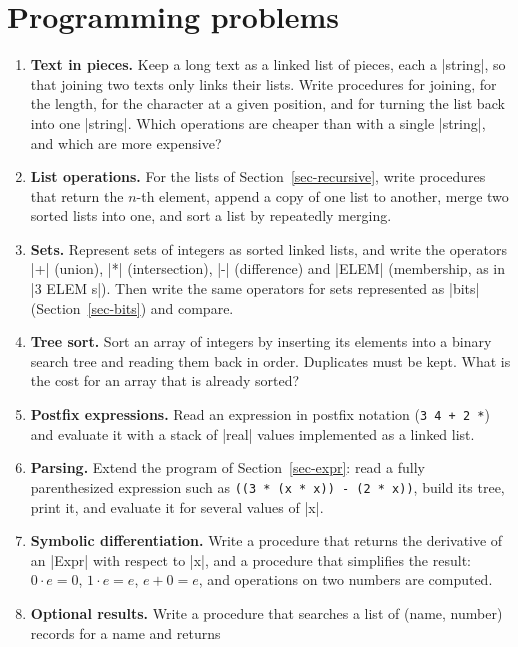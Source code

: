 \section*{Programming problems}

\begin{enumerate}
\item \textbf{Text in pieces.} Keep a long text as a linked list of
  pieces, each a \code|string|, so that joining two texts only links
  their lists. Write procedures for joining, for the length, for the
  character at a given position, and for turning the list back into one
  \code|string|. Which operations are cheaper than with a single
  \code|string|, and which are more expensive?
\item \textbf{List operations.} For the lists of
  Section~\ref{sec-recursive}, write procedures that return the
  $n$-th element, append a copy of one list to another, merge two sorted
  lists into one, and sort a list by repeatedly merging.
\item \textbf{Sets.} Represent sets of integers as sorted linked lists,
  and write the operators \code|+| (union), \code|*| (intersection),
  \code|-| (difference) and \code|ELEM| (membership, as in
  \code|3 ELEM s|). Then write the same operators for sets represented
  as \code|bits| (Section~\ref{sec-bits}) and compare.
\item \textbf{Tree sort.} Sort an array of integers by inserting its
  elements into a binary search tree and reading them back in order.
  Duplicates must be kept. What is the cost for an array that is
  already sorted?
\item \textbf{Postfix expressions.} Read an expression in postfix
  notation (\texttt{3 4 + 2 *}) and evaluate it with a stack of
  \code|real| values implemented as a linked list.
\item \textbf{Parsing.} Extend the program of Section~\ref{sec-expr}:
  read a fully parenthesized expression such as
  \texttt{((3 * (x * x)) - (2 * x))}, build its tree, print it, and
  evaluate it for several values of \code|x|.
\item \textbf{Symbolic differentiation.} Write a procedure that returns
  the derivative of an \code|Expr| with respect to \code|x|, and a
  procedure that simplifies the result: $0 \cdot e = 0$, $1 \cdot e = e$,
  $e + 0 = e$, and operations on two numbers are computed.
\item \textbf{Optional results.} Write a procedure that searches a
  list of (name, number) records for a name and returns

\end{enumerate}
